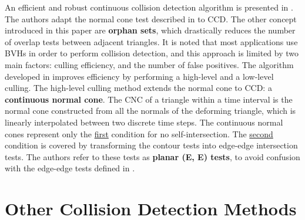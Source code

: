 An efficient and robust continuous collision detection algorithm is presented in \cite{tang08}. The authors adapt the normal cone test described in \cite{provot97} to CCD. The other concept introduced in this paper are \textbf{orphan sets}, which drastically reduces the number of overlap tests between adjacent triangles. It is noted that most applications use BVHs in order to perform collision detection, and this approach is limited by two main factors: culling efficiency, and the number of false positives. The algorithm developed in \cite{tang08} improves efficiency by performing a high-level and a low-level culling. The high-level culling method extends the normal cone to CCD: a \textbf{continuous normal cone}. The CNC of a triangle within a time interval is the normal cone constructed from all the normals of the deforming triangle, which is linearly interpolated between two discrete time steps. The continuous normal cones represent only the \hyperref[prop:sc1]{first} condition for no self-intersection. The \hyperref[prop:sc2]{second} condition is covered by transforming the contour tests into edge-edge intersection tests. The authors refer to these tests as \textbf{planar (E, E) tests}, to avoid confusion with the edge-edge tests defined in \citep{provot97}.


\section{Other Collision Detection Methods}
\label{sec:others}


